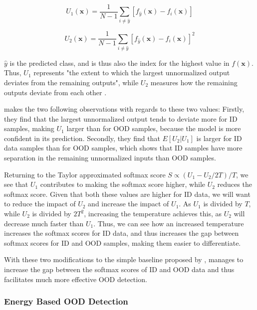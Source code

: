 \documentclass[UKenglish]{uiomasterthesis} %
\theoremstyle{definition}
\begin{document}
\begin{equation}\label{eq::u1u2}
U_{1}(\bm{x})=\frac{1}{N-1}\sum_{i\neq\hat{y}}[f_{\hat{y}}(\bm{x})-f_{i}(\bm{x})]
\end{equation}

\begin{equation}\label{eq::u1u2}
U_{2}(\bm{x})=\frac{1}{N-1}\sum_{i\neq\hat{y}}[f_{\hat{y}}(\bm{x})-f_{i}(\bm{x})]^{2}
\end{equation}

$\hat{y}$ is the predicted class, and is thus also the index for the highest value in $f(\bm{x})$. Thus, $U_1$ represents "the extent to which the largest unnormalized output deviates from the remaining outputs", while $U_2$ measures how the remaining outputs deviate from each other \cite[6]{odin}.

\cite{odin} makes the two following observations with regards to these two values: Firstly, they find that the largest unnormalized output tends to deviate more for ID samples, making $U_1$ larger than for OOD samples, because the model is more confident in its prediction. Secondly, they find that $E[U_2|U_1]$ is larger for ID data samples than for OOD samples, which shows that ID samples have more separation in the remaining unnormalized inputs than OOD samples. 

Returning to the Taylor approximated softmax score ${S\propto {(U_{1}-U_{2}/2T)/T}}$, we see that $U_1$ contributes to making the softmax score higher, while $U_2$ reduces the softmax score. Given that both these values are higher for ID data, we will want to reduce the impact of $U_2$ and increase the impact of $U_1$. As $U_1$ is divided by $T$, while $U_2$ is divided by $2T^2$, increasing the temperature achieves this, as $U_2$ will decrease much faster than $U_1$. Thus, we can see how an increased temperature increases the softmax scores for ID data, and thus increases the gap between softmax scores for ID and OOD samples, making them easier to differentiate.

With these two modifications to the simple baseline proposed by \cite{oodbaseline}, \cite{odin} manages to increase the gap between the softmax scores of ID and OOD data and thus facilitates much more effective OOD detection.
\\

\subsubsection{Energy Based OOD Detection}
\end{document}

